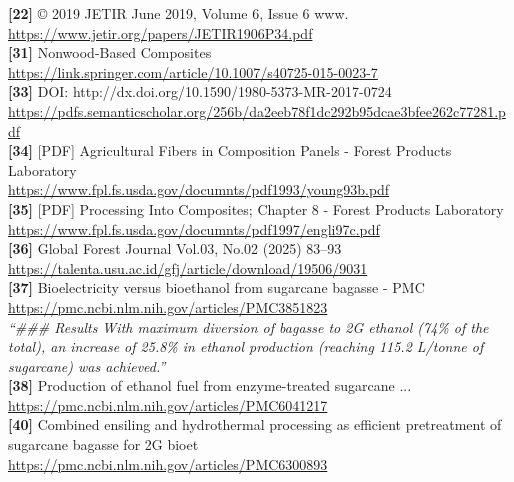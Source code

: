 \textbf{[22]} © 2019 JETIR June 2019, Volume 6, Issue 6                                                            www.\\[0.15em]
\url{https://www.jetir.org/papers/JETIR1906P34.pdf}\\[0.2em]

\textbf{[31]} Nonwood-Based Composites\\[0.15em]
\url{https://link.springer.com/article/10.1007/s40725-015-0023-7}\\[0.2em]

\textbf{[33]} DOI: http://dx.doi.org/10.1590/1980-5373-MR-2017-0724\\[0.15em]
\url{https://pdfs.semanticscholar.org/256b/da2eeb78f1dc292b95dcae3bfee262c77281.pdf}\\[0.2em]

\textbf{[34]} [PDF] Agricultural Fibers in Composition Panels - Forest Products Laboratory\\[0.15em]
\url{https://www.fpl.fs.usda.gov/documnts/pdf1993/young93b.pdf}\\[0.2em]

\textbf{[35]} [PDF] Processing Into Composites; Chapter 8 - Forest Products Laboratory\\[0.15em]
\url{https://www.fpl.fs.usda.gov/documnts/pdf1997/engli97c.pdf}\\[0.2em]

\textbf{[36]} Global Forest Journal Vol.03, No.02 (2025) 83–93\\[0.15em]
\url{https://talenta.usu.ac.id/gfj/article/download/19506/9031}\\[0.2em]

\textbf{[37]} Bioelectricity versus bioethanol from sugarcane bagasse - PMC\\[0.15em]
\url{https://pmc.ncbi.nlm.nih.gov/articles/PMC3851823}\\[0.2em]
\emph{``\#\#\# Results With maximum diversion of bagasse to 2G ethanol (74\% of the total), an increase of 25.8\% in ethanol production (reaching 115.2 L/tonne of sugarcane) was achieved.''}\\[0.45em]

\textbf{[38]} Production of ethanol fuel from enzyme-treated sugarcane ...\\[0.15em]
\url{https://pmc.ncbi.nlm.nih.gov/articles/PMC6041217}\\[0.2em]

\textbf{[40]} Combined ensiling and hydrothermal processing as efficient pretreatment of sugarcane bagasse for 2G bioet\\[0.15em]
\url{https://pmc.ncbi.nlm.nih.gov/articles/PMC6300893}\\[0.2em]

